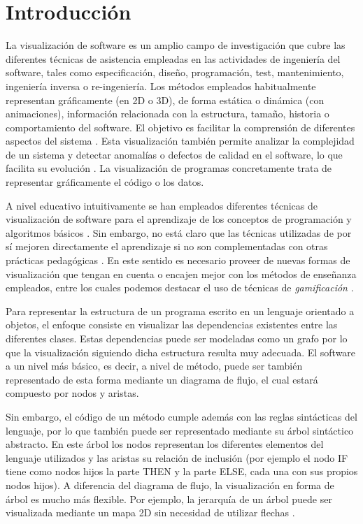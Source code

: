 \documentclass{llncs}
\begin{document}
\section{Introducción}
\label{sec:intro}
La visualización de software es un amplio campo de investigación que cubre las diferentes técnicas de asistencia empleadas en las actividades de ingeniería del software, tales como especificación, diseño, programación, test, mantenimiento, ingeniería inversa o re-ingeniería. Los métodos empleados habitualmente representan gráficamente (en 2D o 3D), de forma estática o dinámica (con animaciones), información relacionada con la estructura, tamaño, historia o comportamiento del software. El objetivo es facilitar la comprensión de diferentes aspectos del sistema \cite{baecker1988enhancing}. Esta visualización también permite analizar la complejidad de un sistema y detectar anomalías o defectos de calidad en el software, lo que facilita su evolución \cite{softwarevisualization}. La visualización de programas concretamente trata de representar gráficamente el código o los datos. 

A nivel educativo intuitivamente se han empleados diferentes técnicas de visualización de software para el aprendizaje de los conceptos de programación y algoritmos básicos \cite{urquiza2009survey}. Sin embargo, no está claro que las técnicas utilizadas de por sí mejoren directamente el aprendizaje si no son complementadas con otras prácticas pedagógicas \cite{naps2002exploring}. En este sentido es necesario proveer de nuevas formas de visualización que tengan en cuenta o encajen mejor con los métodos de enseñanza empleados, entre los cuales podemos destacar el uso de técnicas de \emph{gamificación} \cite{salen2011quest}.

Para representar la estructura de un programa escrito en un lenguaje orientado a objetos, el enfoque consiste en visualizar las dependencias existentes entre las diferentes clases. Estas dependencias puede ser modeladas como un grafo por lo que la visualización siguiendo dicha estructura resulta muy adecuada. El software a un nivel más básico, es decir, a nivel de método, puede ser también representado de esta forma mediante un diagrama de flujo, el cual estará compuesto por nodos y aristas.

Sin embargo, el código de un método cumple además con las reglas sintácticas del lenguaje, por lo que también puede ser representado mediante su árbol sintáctico abstracto. En este árbol los nodos representan los diferentes elementos del lenguaje utilizados y las aristas su relación de inclusión (por ejemplo el nodo IF tiene como nodos hijos la parte THEN y la parte ELSE, cada una con sus propios nodos hijos). A diferencia del diagrama de flujo, la visualización en forma de árbol es mucho más flexible. Por ejemplo, la jerarquía de un árbol puede ser visualizada mediante un mapa 2D sin necesidad de utilizar flechas \cite{softwarevisualization}.
\end{document}
